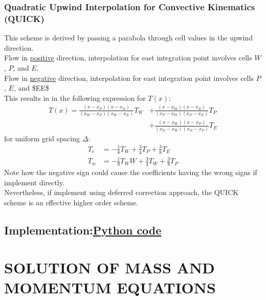 \documentclass[11pt]{article}
\begin{document}
\subsubsection{Quadratic Upwind Interpolation for Convective Kinematics (QUICK)}
\label{sec:org51a3d79}
This scheme is derived by passing a parabola through cell values in the upwind direction. \\
Flow in \uline{positive} direction, interpolation for east integration point involves cells \(W\), \(P\), and \(E\).\\
Flow in \uline{negative} direction, interpolation for east integration point involves cells \(P\), \(E\), and \$EE\$\\
This results in in the following expression for \(T(x)\):
\begin{equation*}
\begin{aligned}
T(x) = \frac{(x-x_P)(x-x_E)}{(x_W-x_P)(x_W-x_E)}T_W &+ \frac{(x-x_W)(x-x_E)}{(x_P-x_W)(x_P-x_E)}T_P\\
&+\frac{(x-x_W)(x-x_P)}{(x_E-x_W)(x_E-x_P)}T_E
\end{aligned}
\end{equation*}
for uniform grid spacing \(\Delta\):
\begin{equation*}
\begin{aligned}
T_e &= -\frac{1}{8}T_W + \frac{3}{4}T_P + \frac{3}{8}T_E\\
T_w &= -\frac{1}{8}T_WW + \frac{3}{4}T_W + \frac{3}{8}T_P
\end{aligned}
\end{equation*}
Note how the negative sign could cause the coefficients having the wrong signs if implement directly.\\
Nevertheless, if implement using deferred correction approach, the QUICK scheme is an effective higher order scheme. 

\subsection{Implementation:\href{advection\_diffusion.py}{Python code}}
\label{sec:orga61f27e}

\clearpage
\section{SOLUTION OF MASS AND MOMENTUM EQUATIONS}
\label{sec:orged64f78}
\end{document}
